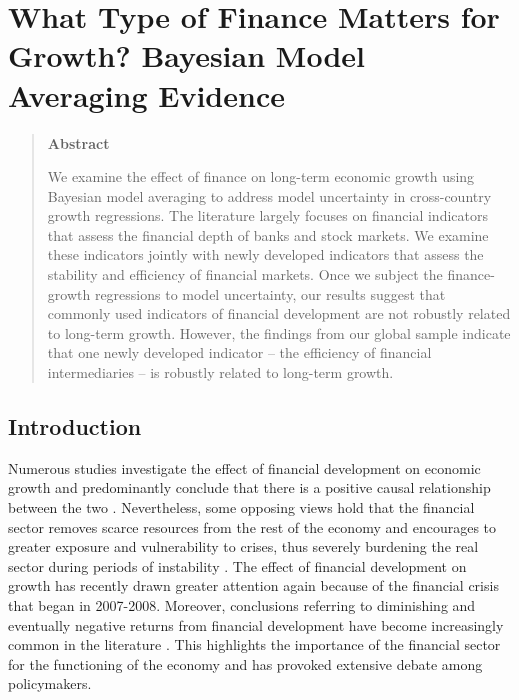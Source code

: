 \chapter{What Type of Finance Matters for Growth? Bayesian Model Averaging Evidence}
\label{chap:two}

\begin{quote}
\begin{center}\textbf{Abstract}\end{center}
	We examine the effect of finance on long-term economic growth using Bayesian model averaging to address model uncertainty in cross-country growth regressions. The literature largely focuses on financial indicators that assess the financial depth of banks and stock markets. We examine these indicators jointly with newly developed indicators that assess the stability and efficiency of financial markets. Once we subject the finance-growth regressions to model uncertainty, our results suggest that commonly used indicators of financial development are not robustly related to long-term growth. However, the findings from our global sample indicate that one newly developed indicator -- the efficiency of financial intermediaries -- is robustly related to long-term growth.     
	\end{quote}

\clearpage
\section{Introduction}
\label{ch2sec:intro}
Numerous studies investigate the effect of financial development on economic growth and predominantly conclude that there is a positive causal relationship between the two \citep{KingLevine1993a, LevineZervos1998, AtjeJovanovich1993}. Nevertheless, some opposing views hold that the financial sector removes scarce resources from the rest of the economy \citep{Tobin1984,Boltonetal2011} and encourages to greater exposure and vulnerability to crises, thus severely burdening the real sector during periods of instability \citep{Kindelberger1978,Minsky1991,Stiglitz2000}. The effect of financial development on growth has recently drawn greater attention again because of the financial crisis that began in 2007-2008. Moreover, conclusions referring to diminishing and eventually negative returns from financial development have become increasingly common in the literature \citep{Arcandetal2012,CecchettiKharroubi2012,LawSingh2014}. This highlights the importance of the financial sector for the functioning of the economy and has provoked extensive debate among policymakers. 

